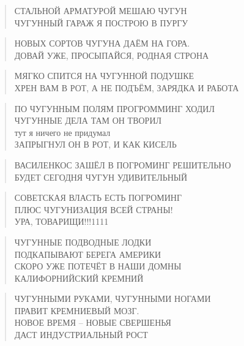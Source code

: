 \poemtitle{***}
\begin{verse}
СТАЛЬНОЙ АРМАТУРОЙ МЕШАЮ ЧУГУН\\
ЧУГУННЫЙ ГАРАЖ Я ПОСТРОЮ В ПУРГУ
\end{verse}

\poemtitle{***}
\begin{verse}
НОВЫХ СОРТОВ ЧУГУНА ДАЁМ НА ГОРА.\\
ДОВАЙ УЖЕ, ПРОСЫПАЙСЯ, РОДНАЯ СТРОНА
\end{verse}

\poemtitle{***}
\begin{verse}
МЯГКО СПИТСЯ НА ЧУГУННОЙ ПОДУШКЕ\\
ХРЕН ВАМ В РОТ, А НЕ ПОДЪЁМ, ЗАРЯДКА И РАБОТА
\end{verse}

\poemtitle{***}
\begin{verse}
ПО ЧУГУННЫМ ПОЛЯМ ПРОГРОММИНГ ХОДИЛ\\
ЧУГУННЫЕ ДЕЛА ТАМ ОН ТВОРИЛ\\
тут я ничего не придумал\\
ЗАПРЫГНУЛ ОН В РОТ, И КАК КИСЕЛЬ
\end{verse}

\poemtitle{***}
\begin{verse}
ВАСИЛЕНКОС ЗАШЁЛ В ПОГРОМИНГ РЕШИТЕЛЬНО\\
БУДЕТ СЕГОДНЯ ЧУГУН УДИВИТЕЛЬНЫЙ
\end{verse}

\poemtitle{***}
\begin{verse}
СОВЕТСКАЯ ВЛАСТЬ ЕСТЬ ПОГРОМИНГ\\
ПЛЮС ЧУГУНИЗАЦИЯ ВСЕЙ СТРАНЫ!\\
УРА, ТОВАРИЩИ!!!1111
\end{verse}

\poemtitle{***}
\begin{verse}
ЧУГУННЫЕ ПОДВОДНЫЕ ЛОДКИ\\
ПОДКАПЫВАЮТ БЕРЕГА АМЕРИКИ\\
СКОРО УЖЕ ПОТЕЧЁТ В НАШИ ДОМНЫ\\
КАЛИФОРНИЙСКИЙ КРЕМНИЙ
\end{verse}

\poemtitle{***}
\begin{verse}
ЧУГУННЫМИ РУКАМИ, ЧУГУННЫМИ НОГАМИ\\
ПРАВИТ КРЕМНИЕВЫЙ МОЗГ.\\
НОВОЕ ВРЕМЯ -- НОВЫЕ СВЕРШЕНЬЯ\\
ДАСТ ИНДУСТРИАЛЬНЫЙ РОСТ
\end{verse}

